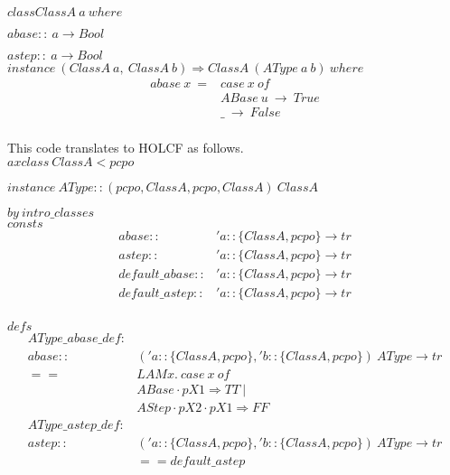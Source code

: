 \documentclass{llncs}
\begin{document}
\noindent $class ClassA \ a \ where$

$abase :: \ a \to Bool $
 
$ astep :: \ a \to Bool $\\

\noindent $instance \ (ClassA \ a, \ ClassA \ b) \Rightarrow ClassA \ (AType \ a \ b) \ where $
$$\begin{array}{ll}
abase \ x \ = & case \ x \ of \\
           &  ABase \ u \ \to \ True \\
            & \_ \ \to \ False \\
\end{array}$$

\noindent This code translates to HOLCF as follows.\\

\noindent $axclass \ ClassA < pcpo$

\noindent $instance \ AType::({pcpo, ClassA}, {pcpo, ClassA}) \ ClassA$ 

$by \ intro\_classes$\\

\noindent $consts$
$$\begin{array}{ll}
abase :: & 'a::\{ClassA, pcpo\} \to tr \\
astep :: & 'a::\{ClassA, pcpo\} \to tr \\
default\_abase :: & 'a::\{ClassA, pcpo\} \to tr \\
default\_astep :: & 'a::\{ClassA, pcpo\} \to tr \\
\end{array}$$

\noindent $defs$
$$\begin{array}{rl}
AType\_abase\_def : & \\
 abase :: & ('a::\{ClassA, pcpo\}, 'b::\{ClassA, pcpo\}) \ AType \to tr \\
                                   == & LAM x. \ case \ x \ of \\
                                  &  ABase \cdot pX1 \Rightarrow TT \ | \\
                                  &  AStep \cdot pX2 \cdot pX1 \Rightarrow FF \\
AType\_astep\_def : & \\
   astep :: & ('a::\{ClassA, pcpo\}, 'b::\{ClassA, pcpo\}) \ AType \to tr \\
                         & == default\_astep \\
\end{array}$$ 
\end{document}
